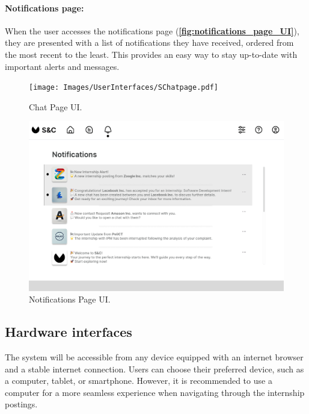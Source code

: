 \paragraph{Notifications page:} When the user accesses the notifications page (\textbf{\autoref{fig:notifications_page_UI}}), they are presented with a list of notifications they have received, ordered from the most recent to the least. This provides an easy way to stay up-to-date with important alerts and messages.

\begin{figure}[H]
    \begin{center}
        \texttt{[image: Images/UserInterfaces/SChatpage.pdf]}
        \caption{Chat Page UI.}
        \label{fig:chat_page_UI}%
    \end{center}
\end{figure}

\begin{figure}[H]
    \begin{center}
        \includegraphics[width=0.9\linewidth]{Images/UserInterfaces/NotificationPage.pdf}
        \caption{Notifications Page UI.}
        \label{fig:notifications_page_UI}%
    \end{center}
\end{figure}


\subsection{Hardware interfaces}
\label{subsec:hardware_interfaces}%


The system will be accessible from any device equipped with an internet
browser and a stable internet connection. Users can choose their
preferred device, such as a computer, tablet, or smartphone. However, it
is recommended to use a computer for a more seamless experience when
navigating through the internship postings.


